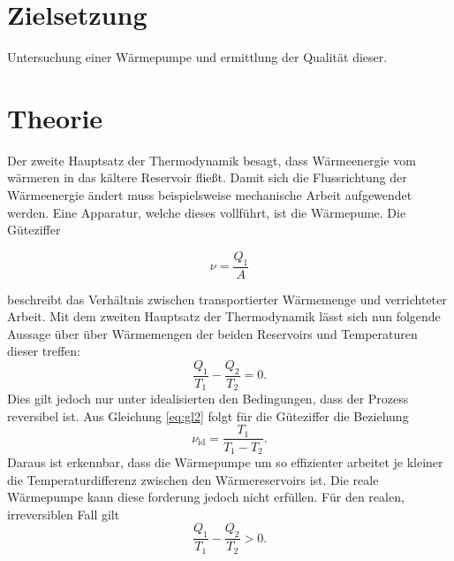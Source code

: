 \section{Zielsetzung}
Untersuchung einer Wärmepumpe und ermittlung der Qualität dieser.
\section{Theorie}
\label{sec:Theorie}

Der zweite Hauptsatz der Thermodynamik besagt, dass Wärmeenergie vom wärmeren in das kältere Reservoir fließt.
Damit sich die Flussrichtung der Wärmeenergie ändert muss beispielsweise mechanische Arbeit aufgewendet werden.
Eine Apparatur, welche dieses vollführt, ist die Wärmepume.
Die Güteziffer

\begin{equation}
	\label{eq:gl1}
	\nu=\frac{Q_1}{A}
\end{equation}

beschreibt das Verhältnis zwischen transportierter Wärmemenge und verrichteter Arbeit.
Mit dem zweiten Hauptsatz der Thermodynamik lässt sich nun folgende Aussage über über Wärmemengen der beiden Reservoirs und Temperaturen dieser treffen:
\begin{equation}
		\label{eq:gl2}
	\frac{Q_1}{T_1}-\frac{Q_2}{T_2}=0.
\end{equation}
Dies gilt jedoch nur unter idealisierten den Bedingungen, dass der Prozess reversibel ist.
Aus Gleichung \eqref{eq:gl2} folgt für die Güteziffer die Beziehung
\begin{equation}
	\nu_{\text{id}}=\frac{T_1}{T_1-T_2}.
	\label{eq:guetezifferideal}
\end{equation}
Daraus ist erkennbar, dass die Wärmepumpe um so effizienter arbeitet je kleiner die Temperaturdifferenz zwischen den Wärmereservoirs ist.
Die reale Wärmepumpe kann diese forderung jedoch nicht erfüllen.
Für den realen, irreversiblen Fall gilt
\begin{equation}
		\label{eq:gl3}
	\frac{Q_1}{T_1}-\frac{Q_2}{T_2}>0 .
\end{equation}
